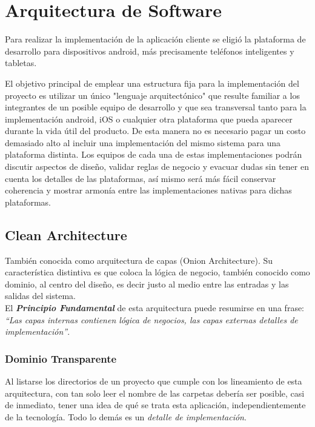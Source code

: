 \section{Arquitectura de Software}

Para realizar la implementación de la aplicación cliente se eligió la plataforma de desarrollo para dispositivos android, más precisamente teléfonos inteligentes y tabletas.

El objetivo principal de emplear una estructura fija para la implementación del proyecto es utilizar un único "lenguaje arquitectónico" que resulte familiar a los integrantes de un posible equipo de desarrollo y que sea transversal tanto para la implementación android, iOS o cualquier otra plataforma que pueda aparecer durante la vida útil del producto. De esta manera no es necesario pagar un costo demasiado alto al incluir una implementación del mismo sistema para una plataforma distinta. 
Los equipos de cada una de estas implementaciones podrán discutir aspectos de diseño, validar reglas de negocio y evacuar dudas sin tener en cuenta los detalles de las plataformas, así mismo será más fácil conservar coherencia y mostrar armonía entre las implementaciones nativas para dichas plataformas.

\subsection{Clean Architecture}
También conocida como arquitectura de capas (Onion Architecture). Su característica distintiva es que coloca la lógica de negocio, también conocido como dominio, al centro del diseño, es decir justo al medio entre las entradas y las salidas del sistema\cite{clean_bob}.\\

El \textbf{\emph{Principio Fundamental}}\label{text:Clean_Princ_Fund} de esta arquitectura puede resumirse en una frase: \textit{``Las capas internas contienen lógica de negocios, las capas externas detalles de implementación''}.

\subsubsection{Dominio Transparente}
Al listarse los directorios de un proyecto que cumple con los lineamiento de esta arquitectura, con tan solo leer el nombre de las carpetas debería ser posible, casi de inmediato, tener una idea de qué se trata esta aplicación, independientemente de la tecnología. Todo lo demás es un \emph{detalle de implementación}\cite{clean_five}.

